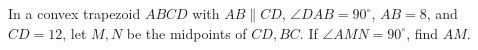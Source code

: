 In a convex trapezoid $ABCD$ with $AB\parallel CD$, $\angle DAB=90^\circ$, $AB=8$, and $CD=12$, let $M,N$ be the midpoints of $CD,BC$. If $\angle AMN=90^\circ$, find $AM$.
